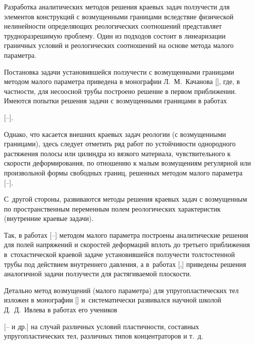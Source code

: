 \makerutitle






Разработка аналитических методов решения краевых задач ползучести для элементов конструкций с возмущенными границами вследствие физической нелинейности определяющих реологических соотношений представляет трудноразрешимую проблему. Один из подходов состоит в линеаризации граничных условий и реологических соотношений на основе метода малого параметра.

Постановка задачи установившейся ползучести с возмущенными границами методом малого параметра приведена в монографии Л.~М.~Качанова [], где, в частности, для несоосной трубы построено решение в первом приближении. Имеются попытки решения задачи с возмущенными границами в работах 

[--].



Однако, что касается внешних краевых задач реологии (с возмущенными границами), здесь следует отметить ряд работ по устойчивости однородного растяжения полосы или цилиндра из вязкого материала, чувствительного к скорости деформирования, по отношению к малым возмущениям регулярной или произвольной формы свободных границ, решенных методом малого параметра [--]. 

С~другой стороны, развиваются методы решения краевых задач с возмущенным по пространственным переменным полем реологических характеристик (внутренние краевые задачи). 

Так, в работах [--] методом малого параметра построены аналитические решения для полей напряжений и скоростей деформаций вплоть до третьего приближения в~стохастической краевой задаче установившейся ползучести толстостенной трубы под действием внутреннего давления, а в~работах [,]  приведены решения аналогичной задачи ползучести для растягиваемой плоскости.



Детально метод возмущений (малого параметра) для упругопластических тел изложен в монографии [] и~систематически развивался научной школой Д.~Д.~Ивлева в работах его учеников

[-- и др.] на случай различных условий пластичности, составных упругопластических тел, различных типов концентраторов и т.~д. 

